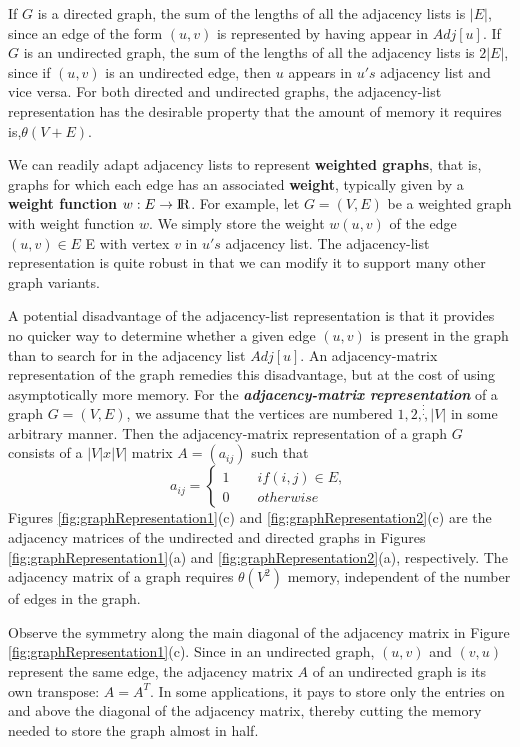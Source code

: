 \documentclass[12pt,a4paper]{book}
\begin{document}
If $G$ is a directed graph, the sum of the lengths of all the adjacency lists is $|E|$, since an edge of the form $(u, v)$ is represented by having appear in $Adj[u]$. If $G$ is an undirected graph, the sum of the lengths of all the adjacency lists is $2|E|$, since if $(u,v)$ is an undirected edge, then $u$ appears in $u's$ adjacency list and vice versa. For both directed and undirected graphs, the adjacency-list representation has the desirable property that the amount of memory it requires is,$\theta(V+E)$.\par
We can readily adapt adjacency lists to represent \textbf{weighted graphs}, that is, graphs for which each edge has an associated \textbf{weight}, typically given by a \textbf{weight function} $w : E \rightarrow \rm I\!R $. For example, let $G=(V,E)$ be a weighted graph with weight function $w$. We simply store the weight $w(u, v)$ of the edge $(u, v) \in E $ E with vertex $v$ in $u's$ adjacency list. The adjacency-list representation is quite robust in that we can modify it to support many other graph variants.\par
A potential disadvantage of the adjacency-list representation is that it provides no quicker way to determine whether a given edge $(u,v)$ is present in the graph than to search for   in the adjacency list $Adj[u]$. An adjacency-matrix representation of the graph remedies this disadvantage, but at the cost of using asymptotically more memory. 
For the \textbf{\textit{adjacency-matrix representation}} of a graph $G=(V,E)$, we assume that the vertices are numbered $1,2,\dot \dot \dot, |V|$ in some arbitrary manner. Then the adjacency-matrix representation of a graph $G$ consists of a $|V| x |V|$ matrix $A =  (a_{ij})$ such that
\[
	a_{ij} = \begin{cases}
			1\qquad if (i,j) \in E, \\
			0\qquad otherwise
			\end{cases}
\]
Figures \ref{fig:graphRepresentation1}(c) and \ref{fig:graphRepresentation2}(c) are the adjacency matrices of the undirected and directed graphs in Figures \ref{fig:graphRepresentation1}(a) and \ref{fig:graphRepresentation2}(a), respectively. The adjacency matrix of a graph requires $\theta(V^{2})$ memory, independent of the number of edges in the graph.\par
Observe the symmetry along the main diagonal of the adjacency matrix in Figure \ref{fig:graphRepresentation1}(c). Since in an undirected graph, $(u,v)$ and $(v,u)$ represent the same edge, the adjacency matrix $A$ of an undirected graph is its own transpose: $A = A^{T}$. In some applications, it pays to store only the entries on and above the diagonal of the adjacency matrix, thereby cutting the memory needed to store the graph almost in half.\par
\end{document}
